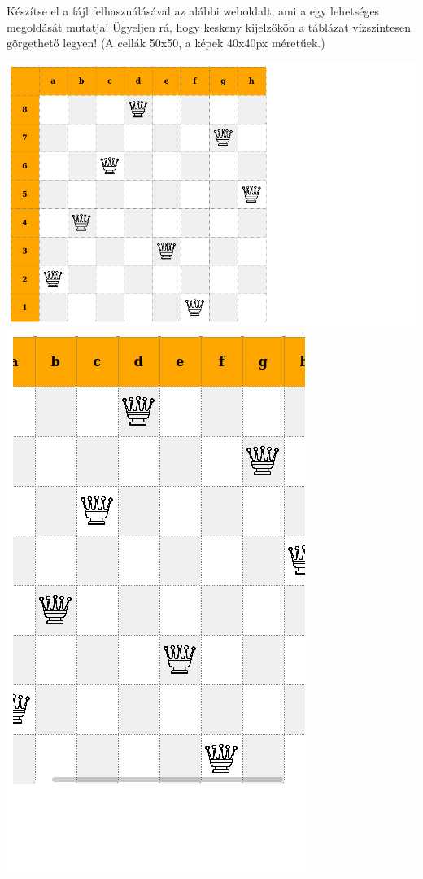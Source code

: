 \begin{frame}
  Készítse el a  fájl felhasználásával az alábbi weboldalt, ami a  egy lehetséges megoldását mutatja! Ügyeljen rá, hogy keskeny kijelzőkön a táblázat vízszintesen görgethető legyen! (A cellák 50x50, a képek 40x40px méretűek.)
  \begin{exampleblock}{}
    \begin{center}
      \includegraphics[scale=0.15]{sakk1.png}\hspace{1cm}
      \includegraphics[scale=0.15]{sakk2.png}
    \end{center}
  \end{exampleblock}  
\end{frame}
